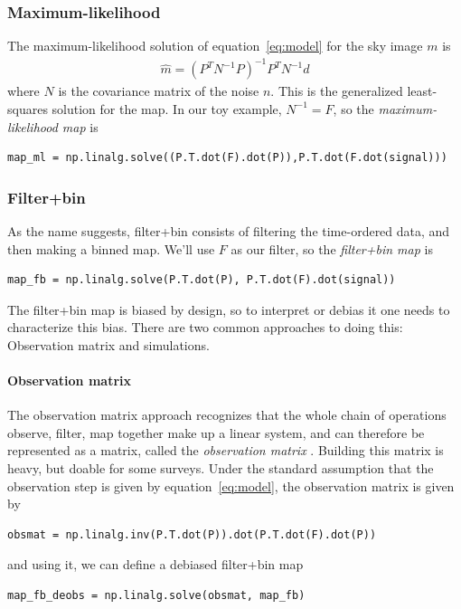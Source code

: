 \documentclass[twocolumn,apj]{aastex63}
\begin{document}
\subsubsection{Maximum-likelihood}
The maximum-likelihood solution of equation~\ref{eq:model} for the
sky image $m$ is
\begin{align}
	\hat m = (P^TN^{-1}P)^{-1}P^TN^{-1}d
\end{align}
where $N$ is the covariance matrix of the noise $n$. This is the
generalized least-squares solution for the map.
In our toy example, $N^{-1} = F$, so the \emph{maximum-likelihood map}
is
\begin{lstlisting}
map_ml = np.linalg.solve((P.T.dot(F).dot(P)),P.T.dot(F.dot(signal)))
\end{lstlisting}

\subsubsection{Filter+bin}
As the name suggests, filter+bin consists of filtering the time-ordered
data, and then making a binned map. We'll use $F$ as our filter, so
the \emph{filter+bin map} is
\begin{lstlisting}
map_fb = np.linalg.solve(P.T.dot(P), P.T.dot(F).dot(signal))
\end{lstlisting}
The filter+bin map is biased by design, so to interpret or debias it one
needs to characterize this bias. There are two common approaches
to doing this: Observation matrix and simulations.

\paragraph{Observation matrix}
The observation matrix approach
recognizes that the whole chain of operations observe, filter, map
together make up a linear system, and can therefore be represented
as a matrix, called the \emph{observation matrix} \citep{bicep2-obsmat}.
Building this matrix is heavy, but doable for some
surveys. Under the standard assumption that the observation step is
given by equation~\ref{eq:model}, the observation matrix is given by
\begin{lstlisting}
obsmat = np.linalg.inv(P.T.dot(P)).dot(P.T.dot(F).dot(P))
\end{lstlisting}
and using it, we can define a debiased filter+bin map
\begin{lstlisting}
map_fb_deobs = np.linalg.solve(obsmat, map_fb)
\end{lstlisting}
\end{document}
